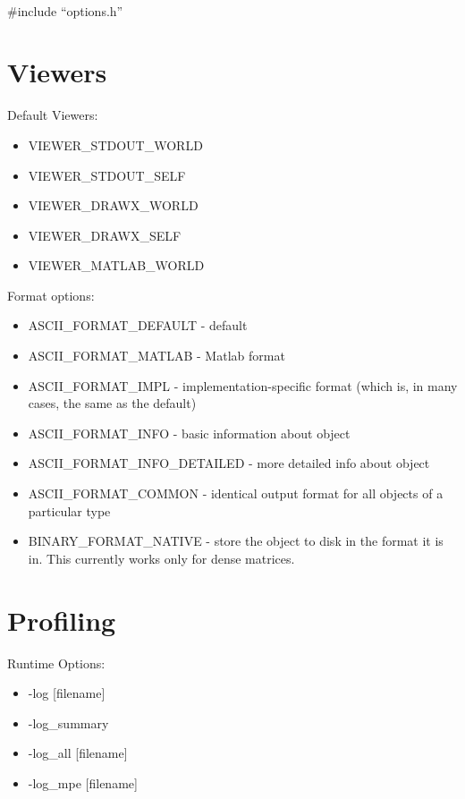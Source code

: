  \\
{  \#include ``options.h''} \\

{\small
\noindent

}

\section{Viewers}

\noindent
Default Viewers:
\begin{itemize}
\item VIEWER\_STDOUT\_WORLD
\item VIEWER\_STDOUT\_SELF
\item VIEWER\_DRAWX\_WORLD
\item VIEWER\_DRAWX\_SELF
\item VIEWER\_MATLAB\_WORLD
\end{itemize}
Format options:
\begin{itemize}
\item ASCII\_FORMAT\_DEFAULT - default
\item ASCII\_FORMAT\_MATLAB - Matlab format
\item  ASCII\_FORMAT\_IMPL - implementation-specific format
      (which is, in many cases, the same as the default)
\item ASCII\_FORMAT\_INFO - basic information about object
\item ASCII\_FORMAT\_INFO\_DETAILED - more detailed info about object
\item ASCII\_FORMAT\_COMMON - identical output format for
       all objects of a particular type
\item BINARY\_FORMAT\_NATIVE - store the object to disk in the format it
      is in. This currently works only for dense matrices.
\end{itemize}

{\small
\noindent

}

\section{Profiling}
Runtime Options:
\begin{itemize}
\item -log [filename]
\item -log\_summary
\item -log\_all [filename]
\item -log\_mpe [filename]
\end{itemize}

